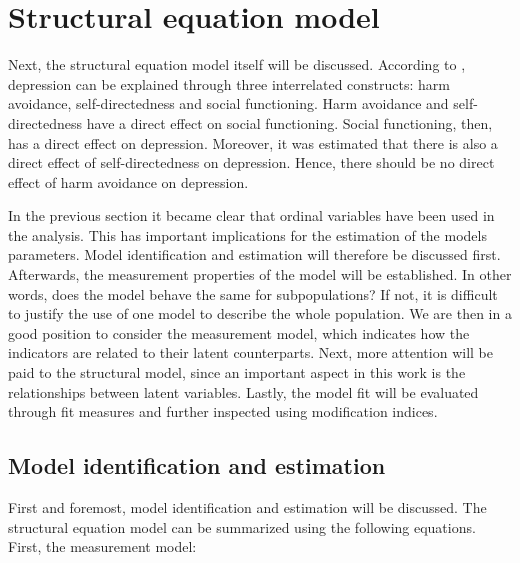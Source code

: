 \documentclass[11pt]{article}
\begin{document}
\FloatBarrier\pagebreak\section{Structural equation model}

Next, the structural equation model itself will be discussed. According to
\textcite{tse2011}, depression can be explained through three interrelated
constructs: harm avoidance, self-directedness and social functioning. Harm
avoidance and self-directedness have a direct effect on social functioning.
Social functioning, then, has a direct effect on depression. Moreover, it was
estimated that there is also a direct effect of self-directedness on depression.
Hence, there should be no direct effect of harm avoidance on depression.

In the previous section it became clear that ordinal variables have been used in
the analysis. This has important implications for the estimation of the models
parameters. Model identification and estimation will therefore be discussed
first. Afterwards, the measurement properties of the model will be established.
In other words, does the model behave the same for subpopulations? If not, it is
difficult to justify the use of one model to describe the whole population. We
are then in a good position to consider the measurement model, which indicates
how the indicators are related to their latent counterparts. Next, more
attention will be paid to the structural model, since an important aspect in
this work is the relationships between latent variables. Lastly, the model fit
will be evaluated through fit measures and further inspected using modification
indices.

\subsection{Model identification and estimation}

First and foremost, model identification and estimation will be discussed.
The structural equation model can be summarized using the following equations.
First, the measurement model:
\end{document}
